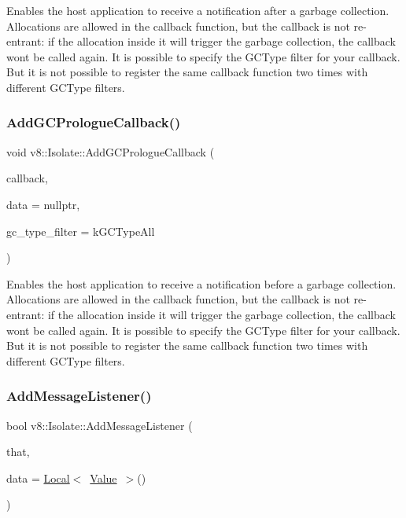 Enables the host application to receive a notification after a garbage collection. Allocations are allowed in the callback function, but the callback is not re-\/entrant\+: if the allocation inside it will trigger the garbage collection, the callback won\textquotesingle{}t be called again. It is possible to specify the G\+C\+Type filter for your callback. But it is not possible to register the same callback function two times with different G\+C\+Type filters. \mbox{\label{classv8_1_1Isolate_a0afef744da7d916484b197fd87375c0c}} 
\subsubsection{\texorpdfstring{Add\+G\+C\+Prologue\+Callback()}{AddGCPrologueCallback()}}
{\footnotesize\ttfamily void v8\+::\+Isolate\+::\+Add\+G\+C\+Prologue\+Callback (\begin{DoxyParamCaption}\item[{G\+C\+Callback\+With\+Data}]{callback,  }\item[{void $\ast$}]{data = {\ttfamily nullptr},  }\item[{\mbox{\hyperlink{namespacev8_ac109d6f27e0c0f9ef4e98bcf7a806cf2}{G\+C\+Type}}}]{gc\+\_\+type\+\_\+filter = {\ttfamily kGCTypeAll} }\end{DoxyParamCaption})}

Enables the host application to receive a notification before a garbage collection. Allocations are allowed in the callback function, but the callback is not re-\/entrant\+: if the allocation inside it will trigger the garbage collection, the callback won\textquotesingle{}t be called again. It is possible to specify the G\+C\+Type filter for your callback. But it is not possible to register the same callback function two times with different G\+C\+Type filters. \mbox{\label{classv8_1_1Isolate_a1aaf99c9ce853fdece7a3b8fc4df49d5}} 
\subsubsection{\texorpdfstring{Add\+Message\+Listener()}{AddMessageListener()}}
{\footnotesize\ttfamily bool v8\+::\+Isolate\+::\+Add\+Message\+Listener (\begin{DoxyParamCaption}\item[{Message\+Callback}]{that,  }\item[{\mbox{\hyperlink{classv8_1_1Local}{Local}}$<$ \mbox{\hyperlink{classv8_1_1Value}{Value}} $>$}]{data = {\ttfamily \mbox{\hyperlink{classv8_1_1Local}{Local}}$<$~\mbox{\hyperlink{classv8_1_1Value}{Value}}~$>$()} }\end{DoxyParamCaption})}

